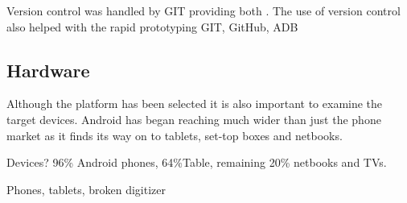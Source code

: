 Version control was handled by GIT providing both . The use of version control also helped with the rapid prototyping  
GIT, GitHub, ADB 

\subsection{Hardware}
Although the platform has been selected it is also important to examine the target devices. Android has began reaching much wider than just the phone market as it finds its way on to tablets, set-top boxes and netbooks.

Devices? 96\% Android phones, 64\%Table, remaining 20\% netbooks and TVs.

Phones, tablets, broken digitizer
